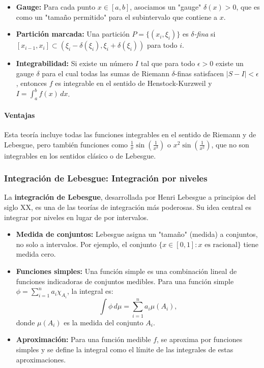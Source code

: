 \documentclass[12pt, a4paper]{article}
\theoremstyle{rioplatense}
\begin{document}
\begin{itemize}
    \item \textbf{Gauge:} Para cada punto \( x \in [a, b] \), asociamos un "gauge" \( \delta(x) > 0 \), que es como un "tamaño permitido" para el subintervalo que contiene a \( x \).
    \item \textbf{Partición marcada:} Una partición \( P = \{(x_i, \xi_i)\} \) es \textit{$\delta$-fina} si \( [x_{i-1}, x_i] \subset (\xi_i - \delta(\xi_i), \xi_i + \delta(\xi_i)) \) para todo \( i \).
    \item \textbf{Integrabilidad:} Si existe un número \( I \) tal que para todo \( \epsilon > 0 \) existe un gauge \( \delta \) para el cual todas las sumas de Riemann \( \delta \)-finas satisfacen \( |S - I| < \epsilon \), entonces \( f \) es integrable en el sentido de Henstock-Kurzweil y \( I = \int_a^b f(x) \, dx \).
\end{itemize}

\paragraph{Ventajas}
Esta teoría incluye todas las funciones integrables en el sentido de Riemann y de Lebesgue, pero también funciones como \( \frac{1}{x} \sin\left(\frac{1}{x^3}\right) \) o \( x^2 \sin\left(\frac{1}{x^2}\right) \), que no son integrables en los sentidos clásico o de Lebesgue.

\subsubsection{Integración de Lebesgue: Integración por niveles}

La \textbf{integración de Lebesgue}, desarrollada por Henri Lebesgue a principios del siglo XX, es una de las teorías de integración más poderosas. Su idea central es integrar por niveles en lugar de por intervalos.

\begin{itemize}
    \item \textbf{Medida de conjuntos:} Lebesgue asigna un "tamaño" (medida) a conjuntos, no solo a intervalos. Por ejemplo, el conjunto \( \{x \in [0,1] : x \text{ es racional}\} \) tiene medida cero.
    \item \textbf{Funciones simples:} Una función simple es una combinación lineal de funciones indicadoras de conjuntos medibles. Para una función simple \( \phi = \sum_{i=1}^n a_i \chi_{A_i} \), la integral es:
    \[
    \int \phi \, d\mu = \sum_{i=1}^n a_i \mu(A_i),
    \]
    donde \( \mu(A_i) \) es la medida del conjunto \( A_i \).
    \item \textbf{Aproximación:} Para una función medible \( f \), se aproxima por funciones simples y se define la integral como el límite de las integrales de estas aproximaciones.
\end{itemize}
\end{document}
